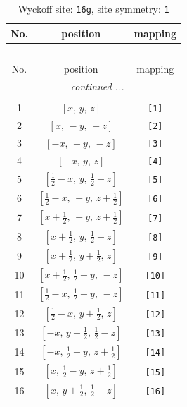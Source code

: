 \documentclass[fleqn,8pt]{jsarticle}
\begin{document}
\begin{longtable}{ccc}
\caption{Wyckoff site: {\tt 16g}, site symmetry: {\tt 1}}
 \\
 \hline \hline
No. & position & mapping \\ \hline \endfirsthead

\multicolumn{2}{l}{\tablename\ \thetable{}} \\
 \hline \hline
No. & position & mapping \\ \hline \endhead

 \hline \hline
\multicolumn{2}{r}{\footnotesize\it continued ...} \\ \endfoot

 \hline \hline
\multicolumn{2}{r}{} \\ \endlastfoot

1 & $\left[ x,\, y,\, z \right]$ & {\tt [1]} \\ \hline
2 & $\left[ x,\, - y,\, - z \right]$ & {\tt [2]} \\ \hline
3 & $\left[ - x,\, - y,\, - z \right]$ & {\tt [3]} \\ \hline
4 & $\left[ - x,\, y,\, z \right]$ & {\tt [4]} \\ \hline
5 & $\left[ \frac{1}{2} - x,\, y,\, \frac{1}{2} - z \right]$ & {\tt [5]} \\ \hline
6 & $\left[ \frac{1}{2} - x,\, - y,\, z + \frac{1}{2} \right]$ & {\tt [6]} \\ \hline
7 & $\left[ x + \frac{1}{2},\, - y,\, z + \frac{1}{2} \right]$ & {\tt [7]} \\ \hline
8 & $\left[ x + \frac{1}{2},\, y,\, \frac{1}{2} - z \right]$ & {\tt [8]} \\ \hline
9 & $\left[ x + \frac{1}{2},\, y + \frac{1}{2},\, z \right]$ & {\tt [9]} \\ \hline
10 & $\left[ x + \frac{1}{2},\, \frac{1}{2} - y,\, - z \right]$ & {\tt [10]} \\ \hline
11 & $\left[ \frac{1}{2} - x,\, \frac{1}{2} - y,\, - z \right]$ & {\tt [11]} \\ \hline
12 & $\left[ \frac{1}{2} - x,\, y + \frac{1}{2},\, z \right]$ & {\tt [12]} \\ \hline
13 & $\left[ - x,\, y + \frac{1}{2},\, \frac{1}{2} - z \right]$ & {\tt [13]} \\ \hline
14 & $\left[ - x,\, \frac{1}{2} - y,\, z + \frac{1}{2} \right]$ & {\tt [14]} \\ \hline
15 & $\left[ x,\, \frac{1}{2} - y,\, z + \frac{1}{2} \right]$ & {\tt [15]} \\ \hline
16 & $\left[ x,\, y + \frac{1}{2},\, \frac{1}{2} - z \right]$ & {\tt [16]} \\
\end{longtable}
\end{document}
